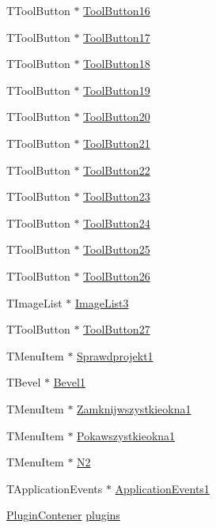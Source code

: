 \begin{CompactItemize}
TToolButton $\ast$ \hyperlink{classTForm1_a6f360b14445883aedb8f6ad892dc27f}{ToolButton16}
\item 
TToolButton $\ast$ \hyperlink{classTForm1_6d324e1cf8b3d25388e8444bb17cca3f}{ToolButton17}
\item 
TToolButton $\ast$ \hyperlink{classTForm1_6459f873cefb4680462772e31df931c4}{ToolButton18}
\item 
TToolButton $\ast$ \hyperlink{classTForm1_88347ab66f85c36c884738d8ee5e58a3}{ToolButton19}
\item 
TToolButton $\ast$ \hyperlink{classTForm1_632d7a7fb1f58ef1eaa7f06813c1eb3d}{ToolButton20}
\item 
TToolButton $\ast$ \hyperlink{classTForm1_14ccc6f80b7fb70f80552b772075bcd9}{ToolButton21}
\item 
TToolButton $\ast$ \hyperlink{classTForm1_221d9932d360c903b3c14f26d7b3ae90}{ToolButton22}
\item 
TToolButton $\ast$ \hyperlink{classTForm1_040e77d5967da02a5aa3c462055f510d}{ToolButton23}
\item 
TToolButton $\ast$ \hyperlink{classTForm1_a2f6a2763d31ea472eb438aefc802161}{ToolButton24}
\item 
TToolButton $\ast$ \hyperlink{classTForm1_1346d2adf8108f59475e9b51746d1b5d}{ToolButton25}
\item 
TToolButton $\ast$ \hyperlink{classTForm1_de1f9eff17d771f91c82706d6aa801ff}{ToolButton26}
\item 
TImageList $\ast$ \hyperlink{classTForm1_7d80296d375fe1604de82f41c6317466}{ImageList3}
\item 
TToolButton $\ast$ \hyperlink{classTForm1_f25d192dc2f51425796a90e4aa58c987}{ToolButton27}
\item 
TMenuItem $\ast$ \hyperlink{classTForm1_70c28fd142eba444dc791df0eafc8385}{Sprawdprojekt1}
\item 
TBevel $\ast$ \hyperlink{classTForm1_fe711fe83a9246f1d158850214061ca4}{Bevel1}
\item 
TMenuItem $\ast$ \hyperlink{classTForm1_fbdc23537e25379aa4c73992641a843f}{Zamknijwszystkieokna1}
\item 
TMenuItem $\ast$ \hyperlink{classTForm1_7b4041d435033e2479bc5df13517e561}{Pokawszystkieokna1}
\item 
TMenuItem $\ast$ \hyperlink{classTForm1_7572e947da6f9d95c11b3ec671dbede4}{N2}
\item 
TApplicationEvents $\ast$ \hyperlink{classTForm1_85037aa8ea01d760f08123d791c416dd}{ApplicationEvents1}
\item 
\hyperlink{classPluginContener}{PluginContener} \hyperlink{classTForm1_d9cbc2c28df5c7941456e1333281ac43}{plugins}
\end{CompactItemize}
